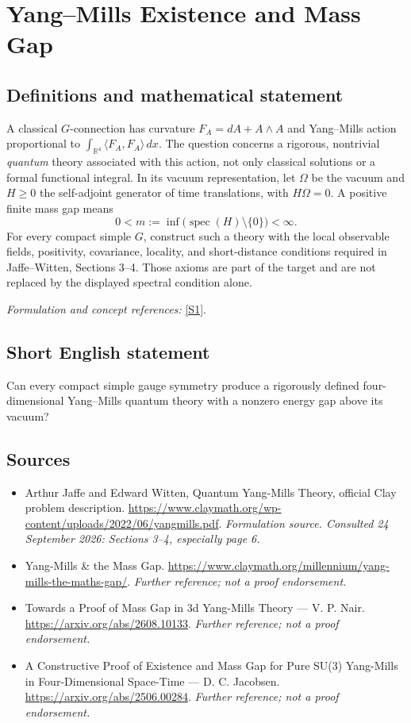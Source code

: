 \documentclass[11pt]{article}
\begin{document}
\section*{\texorpdfstring{Yang–Mills Existence and Mass Gap}{Yang–Mills Existence and Mass Gap}}\label{3}
\subsection{Definitions and mathematical statement}
A classical $G$-connection has curvature $F_A=dA+A\wedge A$ and Yang--Mills action proportional to $\int_{{\mathbb{R}}^4}\langle F_A,F_A\rangle\,dx$. The question concerns a rigorous, nontrivial \emph{quantum} theory associated with this action, not only classical solutions or a formal functional integral. In its vacuum representation, let $\Omega$ be the vacuum and $H\ge0$ the self-adjoint generator of time translations, with $H\Omega=0$. A positive finite mass gap means
\[
 0<m:=\inf\bigl(\operatorname{spec}(H)\setminus\{0\}\bigr)<\infty.
\]
For every compact simple $G$, construct such a theory with the local observable fields, positivity, covariance, locality, and short-distance conditions required in Jaffe--Witten, Sections 3--4. Those axioms are part of the target and are not replaced by the displayed spectral condition alone.
\par\smallskip\textit{Formulation and concept references:} \href{https://www.claymath.org/wp-content/uploads/2022/06/yangmills.pdf}{[S1]}.

\subsection{Short English statement}
Can every compact simple gauge symmetry produce a rigorously defined four-dimensional Yang--Mills quantum theory with a nonzero energy gap above its vacuum?
\subsection{Sources}
\begin{itemize}
\item[S1]Arthur Jaffe and Edward Witten, Quantum Yang-Mills Theory, official Clay problem description.
\url{https://www.claymath.org/wp-content/uploads/2022/06/yangmills.pdf}.
\textit{Formulation source. Consulted 24 September 2026: Sections 3--4, especially page 6.}
\item[S2]Yang-Mills \& the Mass Gap.
\url{https://www.claymath.org/millennium/yang-mills-the-maths-gap/}.
\textit{Further reference; not a proof endorsement.}
\item[S3]Towards a Proof of Mass Gap in 3d Yang-Mills Theory — V. P. Nair.
\url{https://arxiv.org/abs/2608.10133}.
\textit{Further reference; not a proof endorsement.}
\item[S4]A Constructive Proof of Existence and Mass Gap for Pure SU(3) Yang-Mills in Four-Dimensional Space-Time — D. C. Jacobsen.
\url{https://arxiv.org/abs/2506.00284}.
\textit{Further reference; not a proof endorsement.}
\end{itemize}
\end{document}
